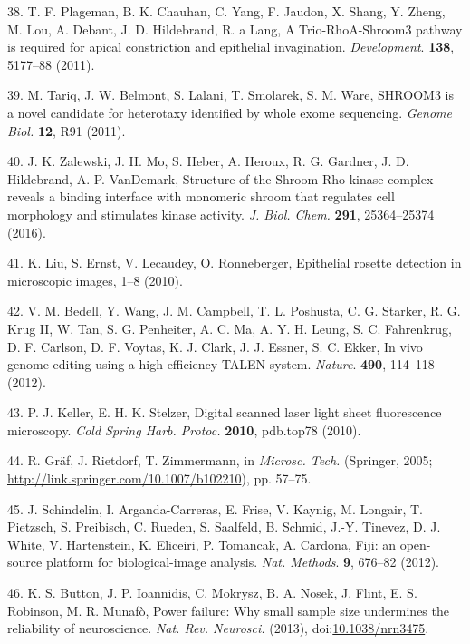 \documentclass[11pt,singlespacinge,twoside]{reedthesis} %
\begin{document}
\leavevmode\hypertarget{ref-Plageman2011}{}%
38. T. F. Plageman, B. K. Chauhan, C. Yang, F. Jaudon, X. Shang, Y. Zheng, M. Lou, A. Debant, J. D. Hildebrand, R. a Lang, A Trio-RhoA-Shroom3 pathway is required for apical constriction and epithelial invagination. \emph{Development}. \textbf{138}, 5177--88 (2011).

\leavevmode\hypertarget{ref-Tariq2011}{}%
39. M. Tariq, J. W. Belmont, S. Lalani, T. Smolarek, S. M. Ware, SHROOM3 is a novel candidate for heterotaxy identified by whole exome sequencing. \emph{Genome Biol.} \textbf{12}, R91 (2011).

\leavevmode\hypertarget{ref-Zalewski2016}{}%
40. J. K. Zalewski, J. H. Mo, S. Heber, A. Heroux, R. G. Gardner, J. D. Hildebrand, A. P. VanDemark, Structure of the Shroom-Rho kinase complex reveals a binding interface with monomeric shroom that regulates cell morphology and stimulates kinase activity. \emph{J. Biol. Chem.} \textbf{291}, 25364--25374 (2016).

\leavevmode\hypertarget{ref-Liu}{}%
41. K. Liu, S. Ernst, V. Lecaudey, O. Ronneberger, Epithelial rosette detection in microscopic images, 1--8 (2010).

\leavevmode\hypertarget{ref-Bedell2012a}{}%
42. V. M. Bedell, Y. Wang, J. M. Campbell, T. L. Poshusta, C. G. Starker, R. G. Krug II, W. Tan, S. G. Penheiter, A. C. Ma, A. Y. H. Leung, S. C. Fahrenkrug, D. F. Carlson, D. F. Voytas, K. J. Clark, J. J. Essner, S. C. Ekker, In vivo genome editing using a high-efficiency TALEN system. \emph{Nature}. \textbf{490}, 114--118 (2012).

\leavevmode\hypertarget{ref-Keller2010c}{}%
43. P. J. Keller, E. H. K. Stelzer, Digital scanned laser light sheet fluorescence microscopy. \emph{Cold Spring Harb. Protoc.} \textbf{2010}, pdb.top78 (2010).

\leavevmode\hypertarget{ref-Graf2005}{}%
44. R. Gräf, J. Rietdorf, T. Zimmermann, in \emph{Microsc. Tech.} (Springer, 2005; \url{http://link.springer.com/10.1007/b102210}), pp. 57--75.

\leavevmode\hypertarget{ref-Schindelin2012}{}%
45. J. Schindelin, I. Arganda-Carreras, E. Frise, V. Kaynig, M. Longair, T. Pietzsch, S. Preibisch, C. Rueden, S. Saalfeld, B. Schmid, J.-Y. Tinevez, D. J. White, V. Hartenstein, K. Eliceiri, P. Tomancak, A. Cardona, Fiji: an open-source platform for biological-image analysis. \emph{Nat. Methods}. \textbf{9}, 676--82 (2012).

\leavevmode\hypertarget{ref-Button2013}{}%
46. K. S. Button, J. P. Ioannidis, C. Mokrysz, B. A. Nosek, J. Flint, E. S. Robinson, M. R. Munafò, Power failure: Why small sample size undermines the reliability of neuroscience. \emph{Nat. Rev. Neurosci.} (2013), doi:\href{https://doi.org/10.1038/nrn3475}{10.1038/nrn3475}.
\end{document}
